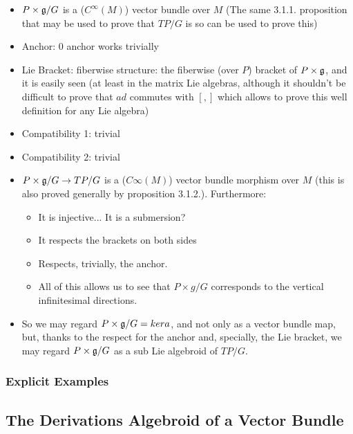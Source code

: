 \begin{itemize}
    \item $P \times \mathfrak{g}/G$ is a ($C^\infty(M)$) vector bundle over $M$ (The same 3.1.1. proposition that may be used to prove that $TP/G$ is so can be used to prove this)
    
    \item Anchor: $0$ anchor works trivially
    
    \item Lie Bracket: fiberwise structure: the fiberwise (over $P$) bracket of $P \times \mathfrak{g}$, and it is easily seen (at least in the matrix Lie algebras, although it shouldn't be difficult to prove that $ad$ commutes with $[,]$ which allows to prove this well definition for any Lie algebra)
    
    \item Compatibility 1: trivial
    
    \item Compatibility 2: trivial
    
    \item $P \times \mathfrak{g}/ G \to TP / G$ is a ($C\infty(M)$) vector bundle morphism over $M$ (this is also proved generally by proposition 3.1.2.). Furthermore:
    \begin{itemize}
        \item It is injective... It is a submersion?
        \item It respects the brackets on both sides
        \item Respects, trivially, the anchor.
        \item All of this allows us to see that $P \times g/G$ corresponds to the vertical infinitesimal directions.
    \end{itemize}
    
    \item So we may regard $P \times \mathfrak{g} / G = ker a$, and not only as a vector bundle map, but, thanks to the respect for the anchor and, specially, the Lie bracket, we may regard $P \times \mathfrak{g}/G$ as a sub Lie algebroid of $TP/G$.
\end{itemize}

\subsubsection{Explicit Examples}

\subsection{The Derivations Algebroid of a Vector Bundle}

